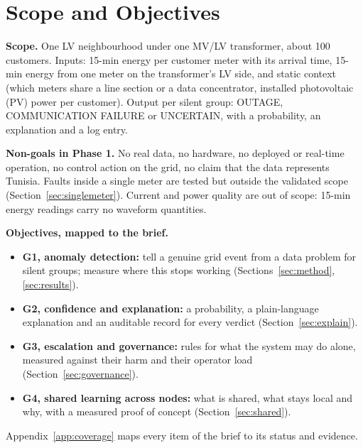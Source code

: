 \section{Scope and Objectives}\label{sec:scope}
\textbf{Scope.} One LV neighbourhood under one MV/LV transformer, about 100 customers. Inputs:
15-min energy per customer meter with its arrival time, 15-min energy from one meter on the
transformer's LV side, and static context (which meters share a line section or a data concentrator,
installed photovoltaic (PV) power per customer). Output per silent group: OUTAGE, COMMUNICATION
FAILURE or UNCERTAIN, with a probability, an explanation and a log entry.

\textbf{Non-goals in Phase 1.} No real data, no hardware, no deployed or real-time operation, no
control action on the grid, no claim that the data represents Tunisia. Faults inside a single meter
are tested but outside the validated scope (Section~\ref{sec:singlemeter}). Current and power quality
are out of scope: 15-min energy readings carry no waveform quantities.

\textbf{Objectives, mapped to the brief.}
\begin{itemize}
\item \textbf{G1, anomaly detection:} tell a genuine grid event from a data problem for silent groups;
measure where this stops working (Sections~\ref{sec:method}, \ref{sec:results}).
\item \textbf{G2, confidence and explanation:} a probability, a plain-language explanation and an
auditable record for every verdict (Section~\ref{sec:explain}).
\item \textbf{G3, escalation and governance:} rules for what the system may do alone, measured
against their harm and their operator load (Section~\ref{sec:governance}).
\item \textbf{G4, shared learning across nodes:} what is shared, what stays local and why, with a
measured proof of concept (Section~\ref{sec:shared}).
\end{itemize}
Appendix~\ref{app:coverage} maps every item of the brief to its status and evidence.
